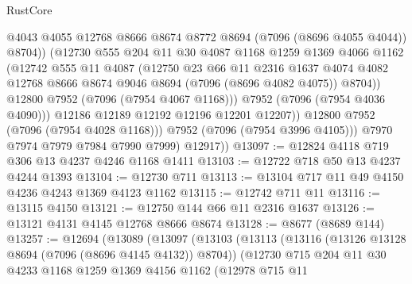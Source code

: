 \begin{lexlean}{RustCore}
\begin{coremodule}
                        @4043
                        @4055
                        @12768
                        @8666
                        @8674
                        @8772
                        @8694
                        (@7096 (@8696 @4055 @4044))
                        @8704))
                    (@12730
                      @555
                      @204
                      @11
                      @30
                      @4087
                      @1168
                      @1259
                      @1369
                      @4066
                      @1162
                      (@12742
                        @555
                        @11
                        @4087
                        (@12750
                          @23
                          @66
                          @11
                          @2316
                          @1637
                          @4074
                          @4082
                          @12768
                          @8666
                          @8674
                          @9046
                          @8694
                          (@7096 (@8696 @4082 @4075))
                          @8704))
                      @12800
                      @7952
                      (@7096 (@7954 @4067 @1168)))
                    @7952
                    (@7096 (@7954 @4036 @4090)))
                  @12186
                  @12189
                  @12192
                  @12196
                  @12201
                  @12207))
              @12800
              @7952
              (@7096 (@7954 @4028 @1168)))
            @7952
            (@7096 (@7954 @3996 @4105)))
          @7970
          @7974
          @7979
          @7984
          @7990
          @7999)
        @12917))
@13097 := @12824 @4118 @719 @306 @13 @4237 @4246 @1168 @1411
@13103 := @12722 @718 @50 @13 @4237 @4244 @1393
@13104 := @12730 @711
@13113 := @13104 @717 @11 @49 @4150 @4236 @4243 @1369 @4123 @1162
@13115 := @12742 @711 @11
@13116 := @13115 @4150
@13121 := @12750 @144 @66 @11 @2316 @1637
@13126 := @13121 @4131 @4145 @12768 @8666 @8674
@13128 := @8677 (@8689 @144)
@13257 := @12694
    (@13089
      (@13097
        (@13103
          (@13113
            (@13116 (@13126 @13128 @8694 (@7096 (@8696 @4145 @4132)) @8704))
            (@12730
              @715
              @204
              @11
              @30
              @4233
              @1168
              @1259
              @1369
              @4156
              @1162
              (@12978
                @715
                @11

\end{coremodule}
\end{lexlean}
